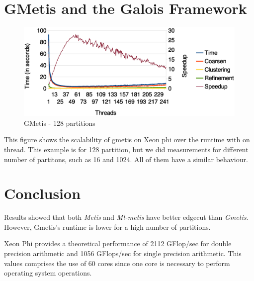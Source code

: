 \documentclass[abstract=on,9pt,twocolumn]{scrartcl}
\begin{document}

\section{GMetis and the Galois Framework} %

\begin{center}
\begin{figure}[htbp]
    \includegraphics[scale=.40]{img/gmetis128.eps}
    \caption{GMetis - 128 partitions}
\end{figure}
\end{center}

This figure shows the scalability of gmetis on Xeon phi over the runtime
with on thread. This example is for 128 partition, but we did
measurements for different number of partitons, such as 16 and 1024. All
of them have a similar behaviour.


\section{Conclusion}

Results showed that both \textit{Metis} and \textit{Mt-metis} have
better edgecut than \textit{Gmetis}. However, Gmetis's runtime is lower
for a high number of partitions.


Xeon Phi provides a theoretical performance of 2112 GFlop/sec for double
precision arithmetic and 1056 GFlops/sec for single precision
arithmetic. This values comprises the use of 60 cores since one core is
necessary to perform operating system operations.






\end{document}
